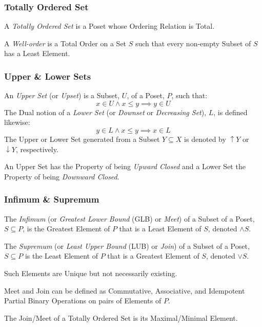 \subsubsection{Totally Ordered Set}\label{sec:total_order}

A \emph{Totally Ordered Set} is a Poset whose Ordering Relation is
Total.

A \emph{Well-order} is a Total Order on a Set $S$ such that every
non-empty Subset of $S$ has a Least Element.



\subsubsection{Upper \& Lower Sets}\label{sec:upper_lower}

An \emph{Upper Set} (or \emph{Upset}) is a Subset, $U$, of a Poset,
$P$, such that:
\[
    x \in U \wedge x \leq y \implies y \in U
\]
The Dual notion of a \emph{Lower Set} (or \emph{Downset} or
\emph{Decreasing Set}), $L$, is defined likewise:
\[
    y \in L \wedge x \leq y \implies x \in L
\]
The Upper or Lower Set generated from a Subset $Y \subseteq X$ is
denoted by $\uparrow Y$ or $\downarrow Y$, respectively.

An Upper Set has the Property of being \emph{Upward Closed} and a
Lower Set the Property of being \emph{Downward Closed}.



\subsubsection{Infimum \& Supremum}\label{sec:glb_lub}

The \emph{Infimum} (or \emph{Greatest Lower Bound} (GLB) or
\emph{Meet}) of a Subset of a Poset, $S \subseteq P$, is the Greatest
Element of $P$ that is a Least Element of $S$, denoted $\wedge S$.

The \emph{Supremum} (or \emph{Least Upper Bound} (LUB) or \emph{Join})
of a Subset of a Poset, $S \subseteq P$ is the Least Element of $P$
that is a Greatest Element of $S$, denoted $\vee S$.

Such Elements are Unique but not necessarily existing.

Meet and Join can be defined as Commutative, Associative, and
Idempotent Partial Binary Operations on pairs of Elements of $P$.

The Join/Meet of a Totally Ordered Set is its Maximal/Minimal Element.



